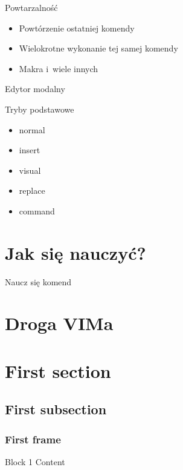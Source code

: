 \documentclass{beamer}
\begin{document}
\begin{frame}[t]{Powtarzalność}
  \begin{itemize}
    \item Powtórzenie ostatniej komendy
    \item Wielokrotne wykonanie tej samej komendy
    \item Makra i~wiele innych
  \end{itemize}
\end{frame}

\begin{frame}[t]{Edytor modalny}
  \begin{block}{Tryby podstawowe}
    \begin{itemize}
      \item normal
      \item insert
      \item visual
      \item replace
      \item command
    \end{itemize}
  \end{block}
\end{frame}

\section{Jak się nauczyć?}
\label{sec:Jak się nauczyć?}

\begin{frame}[t]{Naucz się komend}
\end{frame}


\section{Droga VIMa}
\label{sec:Droga VIMa}


\section{First section}
\subsection{First subsection}
\begin{frame}
\frametitle{First frame}
\begin{block}{Block 1}
Content
\end{block}
\end{frame}
\end{document}
